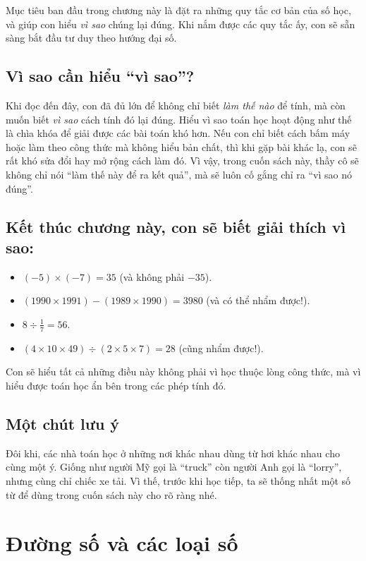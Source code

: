\documentclass[12pt,a4paper]{book}
\begin{document}
Mục tiêu ban đầu trong chương này là đặt ra những quy tắc cơ bản của
số học, và giúp con hiểu \emph{vì sao} chúng lại đúng. Khi nắm được
các quy tắc ấy, con sẽ sẵn sàng bắt đầu tư duy theo hướng đại số.

\subsection*{Vì sao cần hiểu “vì sao”?}
Khi đọc đến đây, con đã đủ lớn để không chỉ biết \emph{làm thế nào}
để tính, mà còn muốn biết \emph{vì sao} cách tính đó lại đúng. Hiểu
vì sao toán học hoạt động như thế là chìa khóa để giải được các bài
toán khó hơn. Nếu con chỉ biết cách bấm máy hoặc làm theo công thức mà
không hiểu bản chất, thì khi gặp bài khác lạ, con sẽ rất khó sửa đổi
hay mở rộng cách làm đó. Vì vậy, trong cuốn sách này, thầy cô sẽ không
chỉ nói “làm thế này để ra kết quả”, mà sẽ luôn cố gắng chỉ ra “vì sao
nó đúng”.

\subsection*{Kết thúc chương này, con sẽ biết giải thích vì sao:}
\begin{itemize}
  \item $(-5)\times(-7)=35$ (và không phải $-35$).
  \item $(1990\times1991)-(1989\times1990)=3980$ (và có thể nhẩm được!).
  \item $8\div\tfrac{1}{7}=56$.
  \item $(4\times10\times49)\div(2\times5\times7)=28$ (cũng nhẩm được!).
\end{itemize}

Con sẽ hiểu tất cả những điều này không phải vì học thuộc lòng công
thức, mà vì hiểu được toán học ẩn bên trong các phép tính đó.

\subsection*{Một chút lưu ý}
Đôi khi, các nhà toán học ở những nơi khác nhau dùng từ hơi khác nhau
cho cùng một ý. Giống như người Mỹ gọi là “truck” còn người Anh gọi là
“lorry”, nhưng cùng chỉ chiếc xe tải. Vì thế, trước khi học tiếp, ta
sẽ thống nhất một số từ để dùng trong cuốn sách này cho rõ ràng nhé.

\section{Đường số và các loại số}
\end{document}
